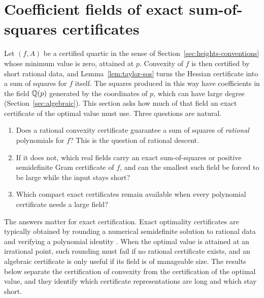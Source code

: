 \section{Coefficient fields of exact sum-of-squares certificates}
\label{sec:fields}

Let $(f,A)$ be a certified quartic in the sense of
Section~\ref{sec:heights-conventions} whose minimum value is zero, attained
at $p$. Convexity of $f$ is then certified by short rational data, and
Lemma~\ref{lem:taylor-sos} turns the Hessian certificate into a sum of squares
for $f$ itself. The squares produced in this way have coefficients in the
field $\mathbb Q(p)$ generated by the coordinates of $p$, which can have large
degree (Section~\ref{sec:algebraic}). This section asks how much of that
field an exact certificate of the optimal value must use. Three questions
are natural.
\begin{enumerate}[label=(\roman*)]
\item Does a rational convexity certificate guarantee a sum of squares of
  \emph{rational} polynomials for $f$? This is the question of rational
  descent.
\item If it does not, which real fields carry an exact sum-of-squares or
  positive semidefinite Gram certificate of $f$, and can the smallest such
  field be forced to be large while the input stays short?
\item Which compact exact certificates remain available when every
  polynomial certificate needs a large field?
\end{enumerate}
The answers matter for exact certification. Exact optimality certificates
are typically obtained by rounding a numerical semidefinite solution to
rational data and verifying a polynomial identity
\cite{PeyrlParrilo2008,KaltofenLiYangZhi2012}. When the optimal value is
attained at an irrational point, such rounding must fail if no rational
certificate exists, and an algebraic certificate is only useful if its
field is of manageable size. The results below separate the certification
of convexity from the certification of the optimal value, and they identify
which certificate representations are long and which stay short.

